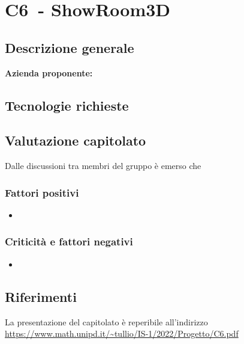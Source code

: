 
\renewcommand{\capName}{ShowRoom3D} %
\renewcommand{\capCode}{C6} %
\renewcommand{\capLink}{https://www.math.unipd.it/~tullio/IS-1/2022/Progetto/C6.pdf} %
\renewcommand{\capProposer}{SanMarco Informatica} %


\section{\capCode\ - \capName} 
\subsection{Descrizione generale}
\textbf{Azienda proponente:}


\subsection{Tecnologie richieste}

\subsection{Valutazione capitolato}
Dalle discussioni tra membri del gruppo è emerso che

\subsubsection{Fattori positivi}

\begin{itemize}
    \item 
\end{itemize}

\subsubsection{Criticità e fattori negativi}

\begin{itemize}
    \item 
\end{itemize}

\subsection{Riferimenti}
La presentazione del capitolato è reperibile all'indirizzo \url{\capLink}